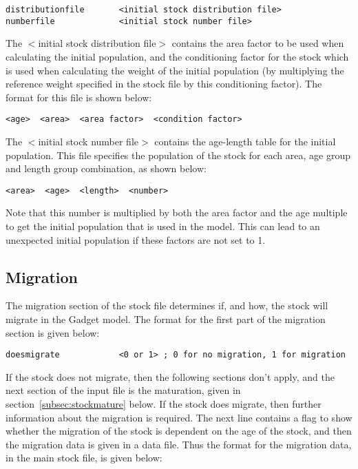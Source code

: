 \documentclass [a4paper, 10pt]{book}
\begin{document}
\begin{verbatim}
distributionfile       <initial stock distribution file>
numberfile             <initial stock number file>
\end{verbatim}

The $<$initial stock distribution file$>$ contains the area factor to be used when calculating the initial population, and the conditioning factor for the stock which is used when calculating the weight of the initial population (by multiplying the reference weight specified in the stock file by this conditioning factor).  The format for this file is shown below:

\begin{verbatim}
<age>  <area>  <area factor>  <condition factor>
\end{verbatim}

The $<$initial stock number file$>$ contains the age-length table for the initial population.  This file specifies the population of the stock for each area, age group and length group combination, as shown below:

\begin{verbatim}
<area>  <age>  <length>  <number>
\end{verbatim}

Note that this number is multiplied by both the area factor and the age multiple to get the initial population that is used in the model.  This can lead to an unexpected initial population if these factors are not set to 1.

\subsection{Migration}\label{subsec:stockmigrate}
The migration section of the stock file determines if, and how, the stock will migrate in the Gadget model. The format for the first part of the migration section is given below:

\begin{verbatim}
doesmigrate            <0 or 1> ; 0 for no migration, 1 for migration
\end{verbatim}

If the stock does not migrate, then the following sections don't apply, and the next section of the input file is the maturation, given in section~\ref{subsec:stockmature} below.  If the stock does migrate, then further information about the migration is required.  The next line contains a flag to show whether the migration of the stock is dependent on the age of the stock, and then the migration data is given in a data file.  Thus the format for the migration data, in the main stock file, is given below:
\end{document}
